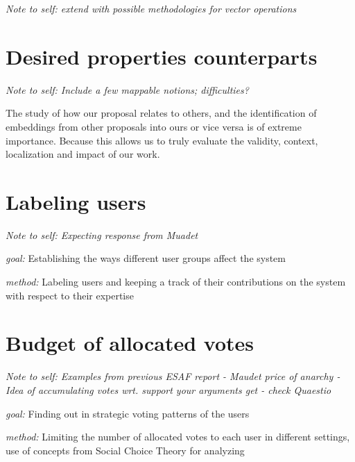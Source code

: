 \documentclass{article}
\begin{document}
\textit{Note to self: extend with possible methodologies for vector operations}


\section{Desired properties counterparts}
\textit{Note to self: Include a few mappable notions; difficulties?}

The study of how our proposal relates to others, and the identification of embeddings from other proposals into ours or vice versa is of extreme importance. Because this allows us to truly evaluate the validity, context, localization and impact of our work.




\section{Labeling users}

\textit{Note to self: Expecting response from Muadet}

\textit{goal:}  Establishing the ways different user groups affect the system 

\textit{method:} Labeling users and keeping a track of their contributions on the system with respect to their expertise  


\section{Budget of allocated votes}

\textit{Note to self: Examples from previous ESAF report - Maudet price of anarchy - Idea of accumulating votes wrt. support your arguments get - check Quaestio}

\textit{goal:} Finding out in strategic voting patterns of the users 

\textit{method:} Limiting the number of allocated votes to each user in different settings, use of concepts from Social Choice Theory for analyzing 
\end{document}
